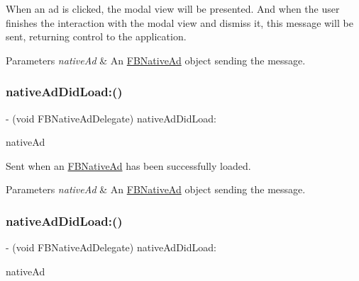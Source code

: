 When an ad is clicked, the modal view will be presented. And when the user finishes the interaction with the modal view and dismiss it, this message will be sent, returning control to the application.


\begin{DoxyParams}{Parameters}
{\em native\+Ad} & An \hyperlink{interfaceFBNativeAd}{F\+B\+Native\+Ad} object sending the message. \\
\hline
\end{DoxyParams}
\mbox{\label{protocolFBNativeAdDelegate_01-p_abad2ba96d5837eee4c2c7f88e216a9f5}} 
\subsubsection{\texorpdfstring{native\+Ad\+Did\+Load\+:()}{nativeAdDidLoad:()}\hspace{0.1cm}{\footnotesize\ttfamily [1/5]}}
{\footnotesize\ttfamily -\/ (void F\+B\+Native\+Ad\+Delegate) native\+Ad\+Did\+Load\+: \begin{DoxyParamCaption}\item[{(\hyperlink{interfaceFBNativeAd}{F\+B\+Native\+Ad} $\ast$)}]{native\+Ad }\end{DoxyParamCaption}}

Sent when an \hyperlink{interfaceFBNativeAd}{F\+B\+Native\+Ad} has been successfully loaded.


\begin{DoxyParams}{Parameters}
{\em native\+Ad} & An \hyperlink{interfaceFBNativeAd}{F\+B\+Native\+Ad} object sending the message. \\
\hline
\end{DoxyParams}
\mbox{\label{protocolFBNativeAdDelegate_01-p_abad2ba96d5837eee4c2c7f88e216a9f5}} 
\subsubsection{\texorpdfstring{native\+Ad\+Did\+Load\+:()}{nativeAdDidLoad:()}\hspace{0.1cm}{\footnotesize\ttfamily [2/5]}}
{\footnotesize\ttfamily -\/ (void F\+B\+Native\+Ad\+Delegate) native\+Ad\+Did\+Load\+: \begin{DoxyParamCaption}\item[{(\hyperlink{interfaceFBNativeAd}{F\+B\+Native\+Ad} $\ast$)}]{native\+Ad }\end{DoxyParamCaption}}


